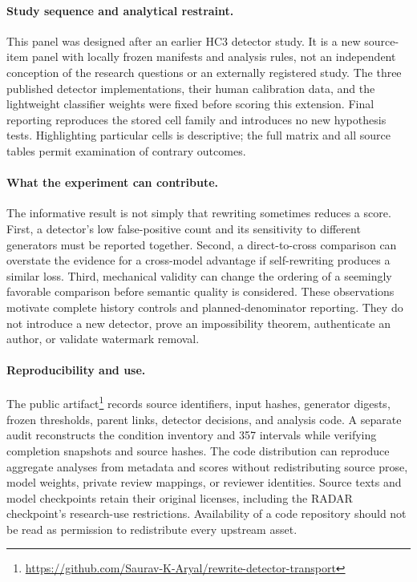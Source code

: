 \paragraph{Study sequence and analytical restraint.}
This panel was designed after an earlier HC3 detector study. It is a new source-item panel with locally frozen manifests and analysis rules, not an independent conception of the research questions or an externally registered study. The three published detector implementations, their human calibration data, and the lightweight classifier weights were fixed before scoring this extension. Final reporting reproduces the stored cell family and introduces no new hypothesis tests. Highlighting particular cells is descriptive; the full matrix and all source tables permit examination of contrary outcomes.

\paragraph{What the experiment can contribute.}
The informative result is not simply that rewriting sometimes reduces a score. First, a detector's low false-positive count and its sensitivity to different generators must be reported together. Second, a direct-to-cross comparison can overstate the evidence for a cross-model advantage if self-rewriting produces a similar loss. Third, mechanical validity can change the ordering of a seemingly favorable comparison before semantic quality is considered. These observations motivate complete history controls and planned-denominator reporting. They do not introduce a new detector, prove an impossibility theorem, authenticate an author, or validate watermark removal.

\paragraph{Reproducibility and use.}
The public artifact\footnote{\url{https://github.com/Saurav-K-Aryal/rewrite-detector-transport}} records source identifiers, input hashes, generator digests, frozen thresholds, parent links, detector decisions, and analysis code. A separate audit reconstructs the condition inventory and 357 intervals while verifying completion snapshots and source hashes. The code distribution can reproduce aggregate analyses from metadata and scores without redistributing source prose, model weights, private review mappings, or reviewer identities. Source texts and model checkpoints retain their original licenses, including the RADAR checkpoint's research-use restrictions. Availability of a code repository should not be read as permission to redistribute every upstream asset.


